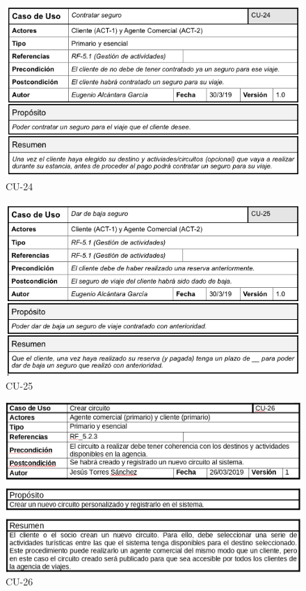\documentclass{article}
\begin{document}
	\begin{figure}[H]
		\centering
		\includegraphics[totalheight=8cm]{CU-24}
		\caption{CU-24}
		\label{fig:cu-24}
	\end{figure}

	\begin{figure}[H]
		\centering
		\includegraphics[totalheight=8cm]{CU-25}
		\caption{CU-25}
		\label{fig:cu-25}
	\end{figure}

	\begin{figure}[H]
		\centering
		\includegraphics[totalheight=8cm]{cu-26}
		\caption{CU-26}
		\label{fig:cu-26}
	\end{figure}
\end{document}
